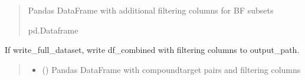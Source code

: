 \documentclass[letterpaper,10pt,english]{sphinxmanual}
\begin{document}
\begin{fulllineitems}
\begin{quote}
\begin{description}
\begin{itemize}
\end{itemize}

\sphinxAtStartPar
Pandas DataFrame with additional filtering columns for BF subsets

\sphinxAtStartPar
pd.Dataframe

\end{description}\end{quote}

\end{fulllineitems}


\begin{fulllineitems}
\label{\detokenize{write_subsets:write_subsets.write_full_dataset_to_file}}
\pysigstartsignatures
{}
\pysigstopsignatures
\sphinxAtStartPar
If write\_full\_dataset, write df\_combined with filtering columns to output\_path.
\begin{quote}\begin{description}
\begin{itemize}
\item {} 
\sphinxAtStartPar
{} () \textendash{} Pandas DataFrame with compound\sphinxhyphen{}target pairs and filtering columns


\end{itemize}
\end{description}
\end{quote}
\end{fulllineitems}
\end{document}
